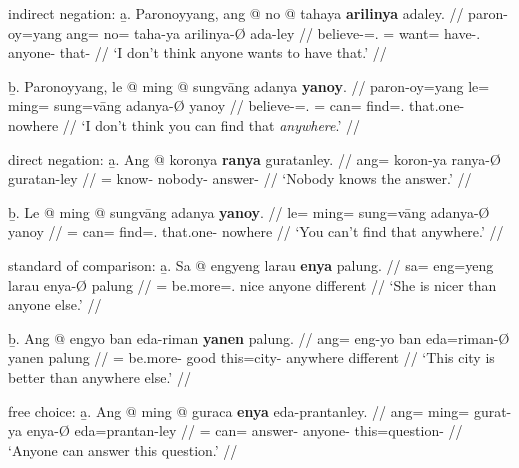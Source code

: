 \a indirect negation:\vspace{.5em} %
	\beginsubsub
	\b{a.} \begingl
		\gla Paronoyyang, ang @ no @ tahaya \textbf{arilinya} adaley. //
		\glb paron-oy=yang ang= no= taha-ya arilinya-Ø ada-ley //
		\glc believe-\Neg{}=\Fsg{}.\Aarg{} \AgtT{}= want= 
			have-\Tsg{}.\M{} anyone-\Top{} that-\PargI{} //
		\glft `I don't think anyone wants to have that.' //
		\endgl\vspace{.5em}
	
	\b{b.} \begingl
		\gla Paronoyyang, le @ ming @ sungvāng adanya \textbf{yanoy}. //
		\glb paron-oy=yang le= ming= sung=vāng adanya-Ø yanoy //
		\glc believe-\Neg{}=\Fsg{}.\Aarg{} \PatTI{}= can= 
			find=\Second{}.\Aarg{} that.one-\Top{} nowhere //
		\glft `I don't think you can find that \emph{anywhere}.' //
		\endgl
	\endsubsub

\a direct negation:\vspace{.5em} %
	\beginsubsub
	\b{a.} \begingl
		\gla Ang @ koronya \textbf{ranya} guratanley. //
		\glb ang= koron-ya ranya-Ø guratan-ley //
		\glc \AgtT{}= know-\TsgM{} nobody-\Top{} answer-\PargI{} //
		\glft `Nobody knows the answer.' //
		\endgl\vspace{.5em}
		
	\b{b.} \begingl
		\gla Le @ ming @ sungvāng adanya \textbf{yanoy}. //
		\glb le= ming= sung=vāng adanya-Ø yanoy //
		\glc \PatTI{}= can= find=\Second{}.\Aarg{} that.one-\Top{} nowhere //
		\glft `You can't find that anywhere.' //
		\endgl
	\endsubsub

\a standard of comparison:\vspace{.5em} %
	\beginsubsub
	\b{a.} \begingl
		\gla Sa @ engyeng larau \textbf{enya} palung. //
		\glb sa= eng=yeng larau enya-Ø palung //
		\glc \PatT{}= be.more=\TsgF{}.\Aarg{} nice anyone different //
		\glft `She is nicer than anyone else.' //
		\endgl\vspace{.5em}
		
	\b{b.} \begingl
		\gla Ang @ engyo ban eda-riman \textbf{yanen} palung. //
		\glb ang= eng-yo ban eda=riman-Ø yanen palung //
		\glc \AgtT{}= be.more-\TsgN{} good this=city-\Top{} anywhere 
			different //
		\glft `This city is better than anywhere else.' //
		\endgl
	\endsubsub

\a free choice:\vspace{.5em} %
	\beginsubsub
	\b{a.} \begingl
		\gla Ang @ ming @ guraca \textbf{enya} eda-prantanley. //
		\glb ang= ming= gurat-ya enya-Ø eda=prantan-ley //
		\glc \AgtT{}= can= answer-\TsgM{} anyone-\Top{} 
				this=question-\PargI{} //
		\glft `Anyone can answer this question.' //
		\endgl\vspace{.5em}
		
